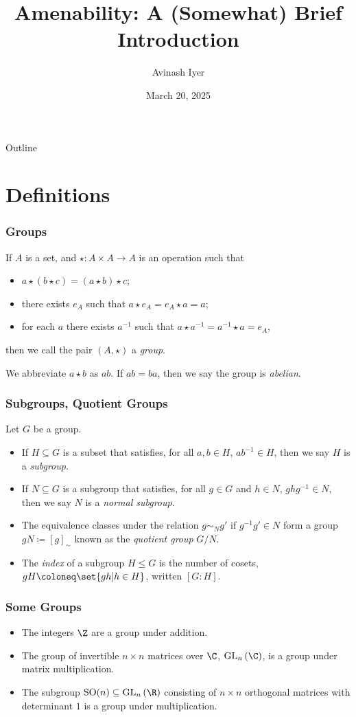 \documentclass{beamer-custom}
\title{Amenability: A (Somewhat) Brief Introduction}
\author{Avinash Iyer}
\institute{Occidental College}
\date{March 20, 2025}
\begin{document}
\begin{frame}
    \titlepage
\end{frame}

\begin{frame}{Outline}
    \tableofcontents
\end{frame}
\section{Definitions}%
\begin{frame}
  \frametitle{Groups}
  If $A$ is a set, and $\star\colon A\times A \rightarrow A$ is an operation such that
  \begin{itemize}
    \item $a\star\left(b\star c\right) = \left(a\star b\right)\star c$;
    \item there exists $e_A$ such that $a\star e_A = e_A\star a = a$;
    \item for each $a$ there exists $a^{-1}$ such that $a\star a^{-1} = a^{-1}\star a = e_A$,
  \end{itemize}
  then we call the pair $\left(A,\star\right)$ a \textit{group}.\pause\hfill\break

  We abbreviate $a\star b$ as $ab$. If $ab = ba$, then we say the group is \textit{abelian}.
\end{frame}
\begin{frame}
  \frametitle{Subgroups, Quotient Groups}
  Let $G$ be a group.
  \begin{itemize}
    \item If $H\subseteq G$ is a subset that satisfies, for all $a,b\in H$, $ab^{-1}\in H$, then we say $H$ is a \textit{subgroup}.\pause
    \item If $N\subseteq G$ is a subgroup that satisfies, for all $g\in G$ and $h\in N$, $ghg^{-1}\in N$, then we say $N$ is a \textit{normal subgroup}.\pause
    \item The equivalence classes under the relation $g\sim_{N} g'$ if $g^{-1}g' \in N$ form a group $gN\coloneqq \left[ g \right]_{\sim}$ known as the \textit{quotient group} $G/N$.
    \item The \textit{index} of a subgroup $H\leq G$ is the number of cosets, $gH\coloneq \set{gh | h\in H}$, written $\left[ G:H \right]$.
  \end{itemize}
\end{frame}
\begin{frame}
  \frametitle{Some Groups}
  \begin{itemize}
    \item The integers $\Z$ are a group under addition.
    \item The group of invertible $n\times n$ matrices over $\C$, $\text{GL}_{n}\left(\C\right)$, is a group under matrix multiplication.
    \item The subgroup $\text{SO}(n)\subseteq \text{GL}_{n}\left( \R \right)$ consisting of $n\times n$ orthogonal matrices with determinant $1$ is a group under multiplication.
  \end{itemize}
\end{frame}
\end{document}
